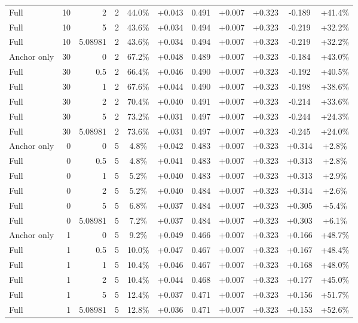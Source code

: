 \begin{table}[htbp]
\begin{tabular}{lrrrccccccc}
Full & 10 & 2 & 2 & 44.0\% & +0.043 & 0.491 & +0.007 & +0.323 & -0.189 & +41.4\% \\
Full & 10 & 5 & 2 & 43.6\% & +0.034 & 0.494 & +0.007 & +0.323 & -0.219 & +32.2\% \\
Full & 10 & 5.08981 & 2 & 43.6\% & +0.034 & 0.494 & +0.007 & +0.323 & -0.219 & +32.2\% \\
Anchor only & 30 & 0 & 2 & 67.2\% & +0.048 & 0.489 & +0.007 & +0.323 & -0.184 & +43.0\% \\
Full & 30 & 0.5 & 2 & 66.4\% & +0.046 & 0.490 & +0.007 & +0.323 & -0.192 & +40.5\% \\
Full & 30 & 1 & 2 & 67.6\% & +0.044 & 0.490 & +0.007 & +0.323 & -0.198 & +38.6\% \\
Full & 30 & 2 & 2 & 70.4\% & +0.040 & 0.491 & +0.007 & +0.323 & -0.214 & +33.6\% \\
Full & 30 & 5 & 2 & 73.2\% & +0.031 & 0.497 & +0.007 & +0.323 & -0.244 & +24.3\% \\
Full & 30 & 5.08981 & 2 & 73.6\% & +0.031 & 0.497 & +0.007 & +0.323 & -0.245 & +24.0\% \\
Anchor only & 0 & 0 & 5 & 4.8\% & +0.042 & 0.483 & +0.007 & +0.323 & +0.314 & +2.8\% \\
Full & 0 & 0.5 & 5 & 4.8\% & +0.041 & 0.483 & +0.007 & +0.323 & +0.313 & +2.8\% \\
Full & 0 & 1 & 5 & 5.2\% & +0.040 & 0.483 & +0.007 & +0.323 & +0.313 & +2.9\% \\
Full & 0 & 2 & 5 & 5.2\% & +0.040 & 0.484 & +0.007 & +0.323 & +0.314 & +2.6\% \\
Full & 0 & 5 & 5 & 6.8\% & +0.037 & 0.484 & +0.007 & +0.323 & +0.305 & +5.4\% \\
Full & 0 & 5.08981 & 5 & 7.2\% & +0.037 & 0.484 & +0.007 & +0.323 & +0.303 & +6.1\% \\
Anchor only & 1 & 0 & 5 & 9.2\% & +0.049 & 0.466 & +0.007 & +0.323 & +0.166 & +48.7\% \\
Full & 1 & 0.5 & 5 & 10.0\% & +0.047 & 0.467 & +0.007 & +0.323 & +0.167 & +48.4\% \\
Full & 1 & 1 & 5 & 10.4\% & +0.046 & 0.467 & +0.007 & +0.323 & +0.168 & +48.0\% \\
Full & 1 & 2 & 5 & 10.4\% & +0.044 & 0.468 & +0.007 & +0.323 & +0.177 & +45.0\% \\
Full & 1 & 5 & 5 & 12.4\% & +0.037 & 0.471 & +0.007 & +0.323 & +0.156 & +51.7\% \\
Full & 1 & 5.08981 & 5 & 12.8\% & +0.036 & 0.471 & +0.007 & +0.323 & +0.153 & +52.6\% \\

\end{tabular}
\end{table}
